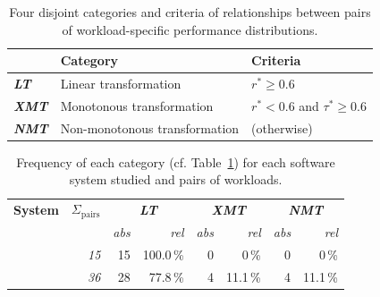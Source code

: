 {{\begin{table}
	\footnotesize
	\caption{Four disjoint categories and criteria of relationships between pairs of workload-specific performance distributions.}
	\centering
\begin{tabular}{lp{4.1cm}p{2.8cm}}	
	\toprule
	 \textbf{} & \textbf{Category} & \textbf{Criteria}\\
	 \midrule
	 \rowcolor{lt-color!40!white}\cellcolor{lt-color}\textit{\textbf{LT}} & {Linear transformation} & $r^* \geq 0.6$ \\
	\rowcolor{xmt-color!40!white}\cellcolor{xmt-color}\textit{\textbf{XMT}} & {Monotonous transformation} & $r^* < 0.6 $ and $ \tau^* \geq 0.6$ \\
	\rowcolor{nmt-color!40!white}\cellcolor{nmt-color}\textit{\textbf{NMT}} & {Non-monotonous transformation}  & (otherwise) \\%
	\bottomrule
\end{tabular}
\label{tab:categorization}
\end{table}

\begin{table}
	\footnotesize
	\centering
	\caption{Frequency of each category (cf. Table~\ref{tab:categorization}) for each software system studied and pairs of workloads.}
\begin{tabular}{p{1.1cm}rrrrrrr}	
	\toprule
	\textbf{System} & \textbf{$\Sigma_\text{pairs}$} & \multicolumn{2}{c}{\textbf{\cellcolor{lt-color}\textit{LT}}} & \multicolumn{2}{c}{\textbf{\cellcolor{xmt-color}\textit{XMT}}} & \multicolumn{2}{c}{\textbf{\cellcolor{nmt-color}\textit{NMT}}}\\
	  & & \textit{abs} &\textit{rel} & \textit{abs} & \textit{rel}& \textit{abs} & \textit{rel}\\
	\midrule
	
	\jumper & \textit{15} &
	\cellcolor{lt-color!100!white}15 & \cellcolor{lt-color!100!white}100.0\,\% & 
	0 & 0\,\% & 
	0 & 0\,\%\\
	
	\kanzi & \textit{36} &
	\cellcolor{lt-color!78!white}28 & \cellcolor{lt-color!78!white}77.8\,\% & 
	\cellcolor{xmt-color!11!white}	4& \cellcolor{xmt-color!11!white}11.1\,\% & 
	\cellcolor{nmt-color!11!white}4 & \cellcolor{nmt-color!11!white}11.1\,\%\\
	

\end{tabular}
\end{table}}}
